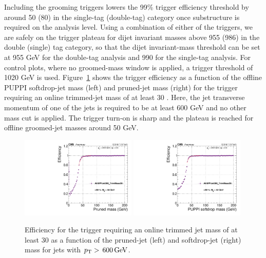 \noindent Including the grooming triggers lowers the 99\% trigger efficiency threshold by around 50 (80) \GeV in the single-tag (double-tag) category once substructure is required on the analysis level. Using a combination of either of the triggers, we are safely on the trigger plateau for dijet invariant masses above 955 (986) \GeV in the double (single) tag category, so that the dijet invariant-mass threshold can be set at 955 GeV for the double-tag analysis and 990 \GeV for the single-tag analysis. For control plots, where no groomed-mass window is applied, a trigger threshold of 1020 GeV is used. Figure~\ref{fig:searchII:grooming-mj-trigger} shows the trigger efficiency as a function of the offline PUPPI softdrop-jet mass (left) and pruned-jet mass (right) for the trigger requiring an online trimmed-jet mass of at least 30 \GeV. Here, the jet transverse momentum of one of the jets is required to be at least 600 GeV and no other mass cut is applied. The trigger turn-on is sharp and the plateau is reached for offline groomed-jet masses around 50 GeV.
\begin{figure}[h!]
\centering
\includegraphics[width=0.49\textwidth]{figures/analysis/search2/AN-16-235/plots/triggereff-prunedmass_fit.pdf}
\includegraphics[width=0.49\textwidth]{figures/analysis/search2/AN-16-235/plots/triggereff-sdmass_fit.pdf}
\caption{Efficiency for the trigger requiring an online trimmed jet mass of at least 30 \GeV as a function of the pruned-jet (left) and softdrop-jet (right) mass for jets with $p_{\mathrm{T}} > \text{\,600}{\ensuremath{\,\text{Ge\hspace{-.08em}V}}}$.}
\label{fig:searchII:grooming-mj-trigger}
\end{figure}
\clearpage
